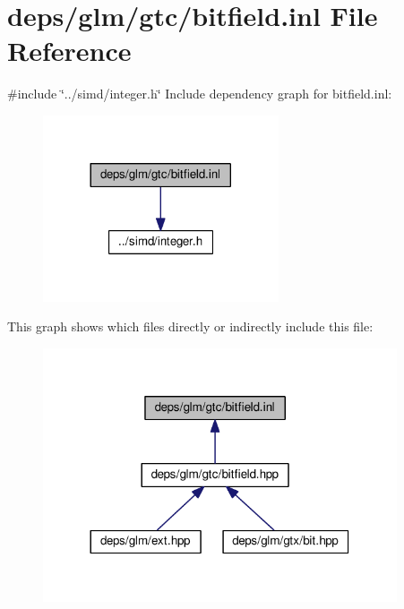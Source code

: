 \hypertarget{bitfield_8inl}{}\section{deps/glm/gtc/bitfield.inl File Reference}
\label{bitfield_8inl}
{\ttfamily \#include \char`\"{}../simd/integer.\+h\char`\"{}}\newline
Include dependency graph for bitfield.\+inl\+:
\nopagebreak
\begin{figure}[H]
\begin{center}
\leavevmode
\includegraphics[width=197pt]{df/d2f/bitfield_8inl__incl}
\end{center}
\end{figure}
This graph shows which files directly or indirectly include this file\+:
\nopagebreak
\begin{figure}[H]
\begin{center}
\leavevmode
\includegraphics[width=296pt]{d5/de2/bitfield_8inl__dep__incl}
\end{center}
\end{figure}
